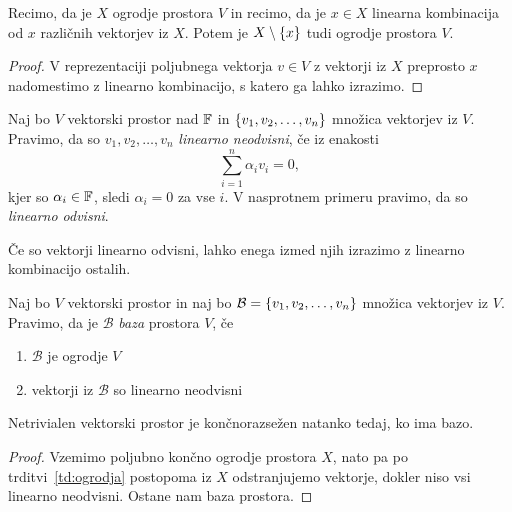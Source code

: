 \documentclass[12pt, a4paper]{article}
\begin{document}
\obvs

\begin{trditev}\label{td:ogrodja}
Recimo, da je $X$ ogrodje prostora $V$ in recimo, da je $x\in X$ linearna kombinacija od $x$ različnih vektorjev iz $X$. Potem je $X\setminus\left\{x\right\}$ tudi ogrodje prostora $V$.
\end{trditev}

\begin{proof}
V reprezentaciji poljubnega vektorja $v\in V$ z vektorji iz $X$ preprosto $x$ nadomestimo z linearno kombinacijo, s katero ga lahko izrazimo.
\end{proof}

\begin{definicija}
Naj bo $V$ vektorski prostor nad $\mathbb{F}$ in $\left\{v_1,v_2,\dots,v_n\right\}$ množica vektorjev iz $V$. Pravimo, da so $v_1,v_2,\dots,v_n$ \emph{linearno neodvisni}, če iz enakosti
\[
\sum_{i=1}^n\alpha_iv_i=0,
\]
kjer so $\alpha_i\in\mathbb{F}$, sledi $\alpha_i=0$ za vse $i$. V nasprotnem primeru pravimo, da so \emph{linearno odvisni}.
\end{definicija}

\begin{opomba}
Če so vektorji linearno odvisni, lahko enega izmed njih izrazimo z linearno kombinacijo ostalih.
\end{opomba}

\begin{okvir}
\begin{definicija}
Naj bo $V$ vektorski prostor in naj bo $\mathcal{B}=\left\{v_1,v_2,\dots,v_n\right\}$ množica vektorjev iz $V$. Pravimo, da je $\mathcal{B}$ \emph{baza} prostora $V$, če

\begin{enumerate}[label=\roman*)]
\item $\mathcal{B}$ je ogrodje $V$
\item vektorji iz $\mathcal{B}$ so linearno neodvisni
\end{enumerate}
\end{definicija}
\end{okvir}

\begin{izrek}
Netrivialen vektorski prostor je končnorazsežen natanko tedaj, ko ima bazo.
\end{izrek}

\begin{proof}
Vzemimo poljubno končno ogrodje prostora $X$, nato pa po trditvi~\ref{td:ogrodja} postopoma iz $X$ odstranjujemo vektorje, dokler niso vsi linearno neodvisni. Ostane nam baza prostora.
\end{proof}
\end{document}

